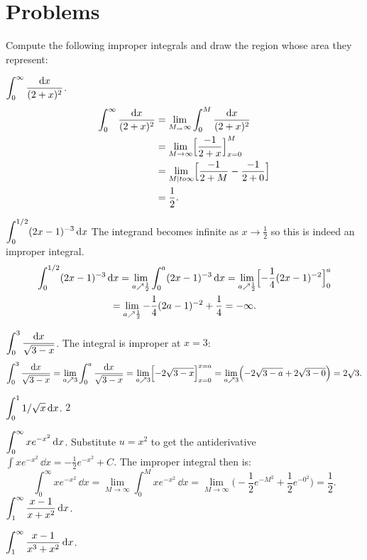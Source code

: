 \section{Problems} %
\problemfont %
\begin{multicols}{2}
\noindent%
Compute the following improper integrals and draw the region whose area they
represent:

\problem $\displaystyle \int_0^\infty \frac{\mathrm{d} x} {(2+x)^2}$. %
\answer %
\begin{align*}
  \int_0^\infty \frac{\mathrm{d} x} {(2+x)^2}
  &= \lim_{M_\to\infty} \int_0^M \frac{\mathrm{d} x} {(2+x)^2}\\
  &= \lim_{M\to\infty} \Bigl[\frac{-1} {2+x}\Bigr]_{x=0}^M \\
  &= \lim_{M|to\infty} \Bigl[\frac{-1} {2+M} - \frac{-1} {2+0}\Bigr] \\
  &= \frac{1} {2}.
\end{align*}
\endanswer

\problem $\displaystyle\int_0^{1/2} (2x-1)^{-3}\,\mathrm{d} x$ %
\answer %
The integrand becomes infinite as $x\to\frac{1} {2}$ so this is indeed an
improper integral.
\begin{multline*}
  \int_0^{1/2} (2x-1)^{-3}\,\mathrm{d} x
  = \lim_{a\nearrow \frac12} \int_{0}^a (2x-1)^{-3} \,\mathrm{d} x
  = \lim_{a\nearrow \frac12} \Bigl[-\frac14(2x-1)^{-2}\Bigr]_{0}^a\\
  = \lim_{a\nearrow \frac12} -\frac14(2a-1)^{-2} + \frac14 =-\infty.
\end{multline*}
\endanswer

\problem $\displaystyle\int_0^{3} \frac{\mathrm{d} x}{\sqrt{3-x}}$. %
\answer %
The integral is improper at $x=3$:
\[
  \int_0^{3} \frac{\mathrm{d} x}{\sqrt{3-x}}
  = \lim_{a\nearrow 3} \int_0^{a} \frac{\mathrm{d} x}{\sqrt{3-x}}
  = \lim_{a\nearrow 3} \Bigl[-2 \sqrt{3-x}\Bigr]_{x=0}^{x=a}
  = \lim_{a\nearrow 3} \Bigl(-2\sqrt{3-a} + 2\sqrt{3-0}\Bigr)
  = 2\surd3.
\]
\endanswer

\problem $\displaystyle\int_0^1 1/\sqrt{x}\,\mathrm{d} x$. %
\answer %
$2$
\endanswer

\problem $\displaystyle \int_0^\infty x e^{-x^2} \,\mathrm{d} x$. %
\answer %
Substitute $u=x^2$ to get the antiderivative
$\int xe^{-x^2}\,\dd x = -\frac12 e^{-x^2}+C$.  The improper integral then is:
\[
\int_0^\infty xe^{-x^2} \,\dd x =
\lim_{M\to\infty} \int_0^M xe^{-x^2} \,\dd x =
\lim_{M\to\infty} \bigl(-\frac12e^{-M^2} + \frac 12 e^{-0^2}\bigr) = \frac 12.
\]
\endanswer
\problem $\displaystyle \int_1^\infty \frac{x-1} {x+x^2}\,\mathrm{d} x$. %

\problem $\displaystyle \int_1^\infty \frac{x-1} {x^3+x^2}\,\mathrm{d} x$. %


\end{multicols}
